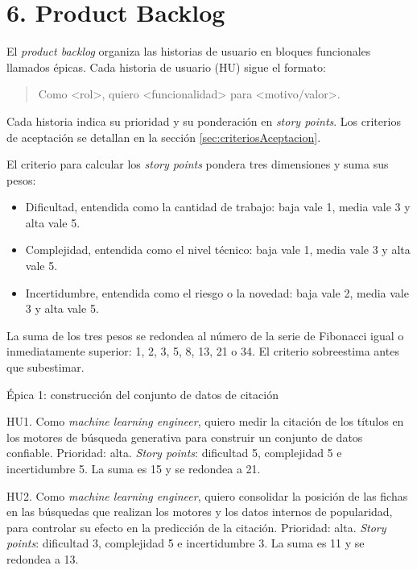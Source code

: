 \documentclass[
11pt, %
codirector, %
]{charter}
\begin{document}
\section{6. Product Backlog}
\label{sec:backlog}

El \textit{product backlog} organiza las historias de usuario en bloques funcionales llamados épicas. Cada historia de usuario (HU) sigue el formato: 

\begin{quote}
Como \textless rol\textgreater, quiero \textless funcionalidad\textgreater{} para \textless motivo/valor\textgreater.
\end{quote}

Cada historia indica su prioridad y su ponderación en \textit{story points}. Los criterios de aceptación se detallan en la sección \ref{sec:criteriosAceptacion}.

El criterio para calcular los \textit{story points} pondera tres dimensiones y suma sus pesos:

\begin{itemize}
	\item Dificultad, entendida como la cantidad de trabajo: baja vale 1, media vale 3 y alta vale 5.
	\item Complejidad, entendida como el nivel técnico: baja vale 1, media vale 3 y alta vale 5.
	\item Incertidumbre, entendida como el riesgo o la novedad: baja vale 2, media vale 3 y alta vale 5.
\end{itemize}

La suma de los tres pesos se redondea al número de la serie de Fibonacci igual o inmediatamente superior: 1, 2, 3, 5, 8, 13, 21 o 34. El criterio sobreestima antes que subestimar.

Épica 1: construcción del conjunto de datos de citación

HU1. Como \textit{machine learning engineer}, quiero medir la citación de los títulos en los motores de búsqueda generativa para construir un conjunto de datos confiable. Prioridad: alta. \textit{Story points}: dificultad 5, complejidad 5 e incertidumbre 5. La suma es 15 y se redondea a 21.

HU2. Como \textit{machine learning engineer}, quiero consolidar la posición de las fichas en las búsquedas que realizan los motores y los datos internos de popularidad, para controlar su efecto en la predicción de la citación. Prioridad: alta. \textit{Story points}: dificultad 3, complejidad 5 e incertidumbre 3. La suma es 11 y se redondea a 13.
\end{document}
